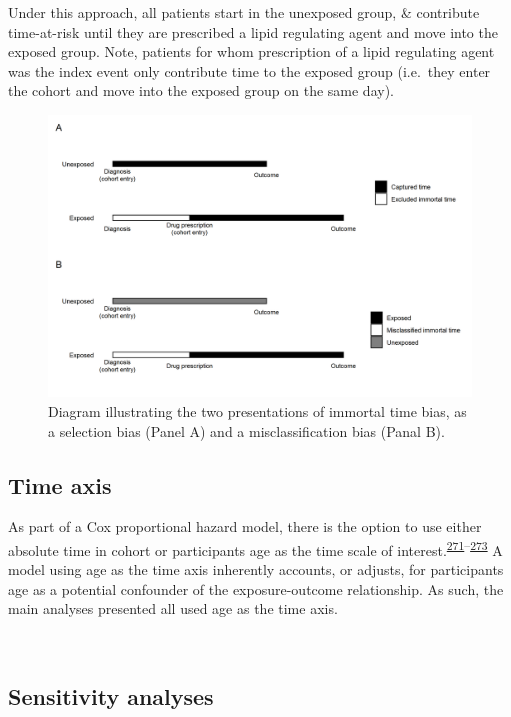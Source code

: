 \documentclass[a4paper, twoside]{templates/ociamthesis}
\begin{document}
Under this approach, all patients start in the unexposed group, \& contribute time-at-risk until they are prescribed a lipid regulating agent and move into the exposed group. Note, patients for whom prescription of a lipid regulating agent was the index event only contribute time to the exposed group (i.e.~they enter the cohort and move into the exposed group on the same day).





\begin{figure}[H]
\includegraphics[width=1\linewidth]{figures/cprd-analysis/immortal_time} \caption[shortcap]{Diagram illustrating the two presentations of immortal time bias, as a selection bias (Panel A) and a misclassification bias (Panal B).}\label{fig:immortalTimeBias}
\end{figure}

\hypertarget{time-axis}{%
\subsection{Time axis}\label{time-axis}}

As part of a Cox proportional hazard model, there is the option to use either absolute time in cohort or participants age as the time scale of interest.\textsuperscript{\protect\hyperlink{ref-lamarca1998}{271}--\protect\hyperlink{ref-pencina2007}{273}} A model using age as the time axis inherently accounts, or adjusts, for participants age as a potential confounder of the exposure-outcome relationship. As such, the main analyses presented all used age as the time axis.

~

\hypertarget{sensitivity-analyses-1}{%
\subsection{Sensitivity analyses}\label{sensitivity-analyses-1}}
\end{document}
